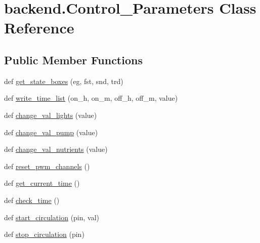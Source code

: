 \hypertarget{classbackend_1_1Control__Parameters}{}\section{backend.\+Control\+\_\+\+Parameters Class Reference}
\label{classbackend_1_1Control__Parameters}
\subsection*{Public Member Functions}
\begin{DoxyCompactItemize}
\item 
def \hyperlink{classbackend_1_1Control__Parameters_ae878384dd1a339751250d6868daa7ed0_ae878384dd1a339751250d6868daa7ed0}{get\+\_\+state\+\_\+boxes} (eg, fst, snd, trd)
\item 
def \hyperlink{classbackend_1_1Control__Parameters_ac0ea3fa0e5b78766667cd717f7dd03e1_ac0ea3fa0e5b78766667cd717f7dd03e1}{write\+\_\+time\+\_\+list} (on\+\_\+h, on\+\_\+m, off\+\_\+h, off\+\_\+m, value)
\item 
def \hyperlink{classbackend_1_1Control__Parameters_ae5c14a3e6d3cb8ab572afa7d732abe93_ae5c14a3e6d3cb8ab572afa7d732abe93}{change\+\_\+val\+\_\+lights} (value)
\item 
def \hyperlink{classbackend_1_1Control__Parameters_acaf4c2a8133bddbd5cd7a8e557f322ee_acaf4c2a8133bddbd5cd7a8e557f322ee}{change\+\_\+val\+\_\+pump} (value)
\item 
def \hyperlink{classbackend_1_1Control__Parameters_afd7d566a865d6ce63c6b14982409eda8_afd7d566a865d6ce63c6b14982409eda8}{change\+\_\+val\+\_\+nutrients} (value)
\item 
def \hyperlink{classbackend_1_1Control__Parameters_a73190d45c0f933d9eb703545125d8d43_a73190d45c0f933d9eb703545125d8d43}{reset\+\_\+pwm\+\_\+channels} ()
\item 
def \hyperlink{classbackend_1_1Control__Parameters_a1cb2bf210e04842eb8530306d10f0120_a1cb2bf210e04842eb8530306d10f0120}{get\+\_\+current\+\_\+time} ()
\item 
def \hyperlink{classbackend_1_1Control__Parameters_a7ea529f7257a3e272b93324296dd5844_a7ea529f7257a3e272b93324296dd5844}{check\+\_\+time} ()
\item 
def \hyperlink{classbackend_1_1Control__Parameters_a41031342b9072faa0e6b236e9e106694_a41031342b9072faa0e6b236e9e106694}{start\+\_\+circulation} (pin, val)
\item 
def \hyperlink{classbackend_1_1Control__Parameters_a0ebe83ac5e2dea477f1971ab9e66cb23_a0ebe83ac5e2dea477f1971ab9e66cb23}{stop\+\_\+circulation} (pin)
\end{DoxyCompactItemize}


